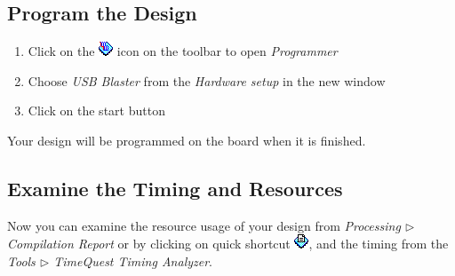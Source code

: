 \documentclass[12pt, logo=tehranDLDL/ut]{tehranDLDL}
\begin{document}
\begin{appendices}
\subsection{Program the Design}

\begin{enumerate}
    \item Click on the \includegraphics[height=2ex]{programmer.png} icon on the toolbar to open \textit{Programmer}
    \item Choose \textit{USB Blaster} from the \textit{Hardware setup} in the new window
    \item Click on the start button
\end{enumerate}

 Your design will be programmed on the board when it is finished.

\subsection{Examine the Timing and Resources}

Now you can examine the resource usage of your design from \textit{Processing $\rhd$ Compilation Report} or by clicking on quick shortcut \includegraphics[height=2ex]{report.png}, and the timing from the \textit{Tools $\rhd$ TimeQuest Timing Analyzer}.

\end{appendices}
\end{document}
